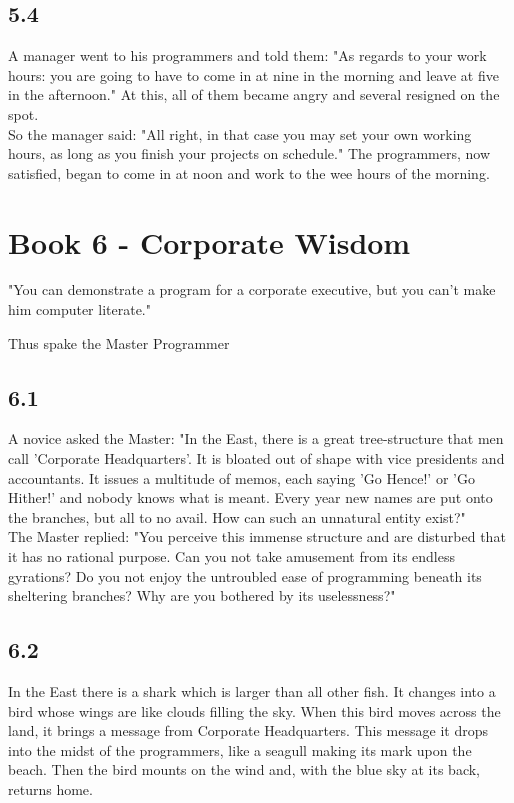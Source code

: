 \documentclass[14pt, letterpaper]{book}
\begin{document}
\section*{5.4}
A manager went to his programmers and told them: "As regards to your work hours: you are going to have to come in at nine in the morning and leave at five in the afternoon." At this, all of them became angry and several resigned on the spot.\\

So the manager said: "All right, in that case you may set your own working hours, as long as you finish your projects on schedule." The programmers, now satisfied, began to come in at noon and work to the wee hours of the morning.

\chapter*{Book 6 - Corporate Wisdom}
\epigraph{"You can demonstrate a program for a corporate executive, but you can't make him computer literate."}{Thus spake the Master Programmer}

\section*{6.1}
A novice asked the Master: "In the East, there is a great tree-structure that men call 'Corporate Headquarters'. It is bloated out of shape with vice presidents and accountants. It issues a multitude of memos, each saying 'Go Hence!' or 'Go Hither!' and nobody knows what is meant. Every year new names are put onto the branches, but all to no avail. How can such an unnatural entity exist?"\\

The Master replied: "You perceive this immense structure and are disturbed that it has no rational purpose. Can you not take amusement from its endless gyrations? Do you not enjoy the untroubled ease of programming beneath its sheltering branches? Why are you bothered by its uselessness?"

\section*{6.2}
In the East there is a shark which is larger than all other fish. It changes into a bird whose wings are like clouds filling the sky. When this bird moves across the land, it brings a message from Corporate Headquarters. This message it drops into the midst of the programmers, like a seagull making its mark upon the beach. Then the bird mounts on the wind and, with the blue sky at its back, returns home.\\
\end{document}
